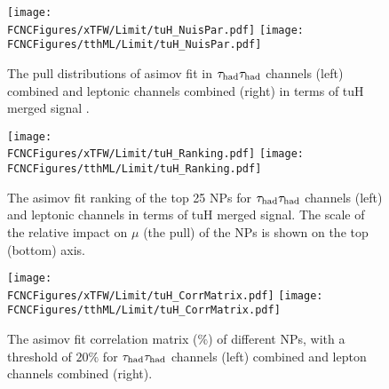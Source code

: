 \begin{figure}[htb]
\centering
\texttt{[image: \\FCNCFigures/xTFW/Limit/tuH\_NuisPar.pdf]}
\texttt{[image: \\FCNCFigures/tthML/Limit/tuH\_NuisPar.pdf]}
\caption{ The pull distributions of asimov fit in $\tau_\text{had}{}\tau_\text{had}$ channels (left) combined and leptonic channels combined (right) in terms of tuH merged signal . }
\label{fig:fcnc_pull_sb_data}
\end{figure}

\begin{figure}[htb]
\centering
\texttt{[image: \\FCNCFigures/xTFW/Limit/tuH\_Ranking.pdf]}
\texttt{[image: \\FCNCFigures/tthML/Limit/tuH\_Ranking.pdf]}
\caption{ The asimov fit ranking of the top 25 NPs for $\tau_\text{had}{}\tau_\text{had}$ channels (left) and leptonic channels in terms of tuH merged signal. The scale of the relative impact on $\mu$ (the pull) of the NPs is shown on the top (bottom) axis.}
\label{fig:fcnc_rank_data}
\end{figure}

\begin{figure}[htb]
\centering
\texttt{[image: \\FCNCFigures/xTFW/Limit/tuH\_CorrMatrix.pdf]}
\texttt{[image: \\FCNCFigures/tthML/Limit/tuH\_CorrMatrix.pdf]}
\caption{ The asimov fit correlation matrix ($\%$) of different NPs, with a threshold of $20\%$ for $\tau_\text{had}{}\tau_\text{had}$ channels (left) combined and lepton channels combined (right). }
\label{fig:fcnc_correl_data}
\end{figure}
